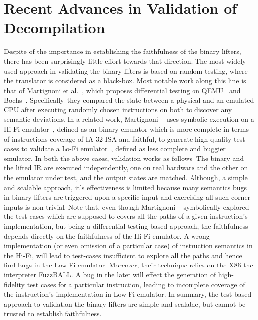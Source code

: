 \section{Recent Advances in Validation of Decompilation}\label{sec:recent-advances}

Despite of the importance in establishing the faithfulness of the binary
lifters, there has been surprisingly little effort towards that direction.
%
The most widely used approach in validating the binary lifters is based on
random testing, where the translator is considered as a black-box. Most notable
work along this line  is that of Martignoni et al.~\cite{Martignoni:ISSTA2009,
  Martignoni:ISSTA2010}, which proposes differential testing on
  QEMU~\cite{QEMU:USENIX05} and Bochs~\cite{Bochs1996}.  Specifically, they
  compared the state between a physical and an emulated CPU after executing
  randomly chosen instructions on both to discover any semantic deviations. In
  a related work, Martignoni \etal~\cite{Martignoni:ASPLOS2012} uses symbolic
  execution on a Hi-Fi emulator~\cite{Bochs1996}, defined as an binary emulator
  which is more complete in terms of instructions coverage of IA-32 ISA and
  faithful, to generate high-quality test cases to validate  a Lo-Fi
  emulator~\cite{QEMU:USENIX05}, defined as  less complete and buggier
  emulator. In both the above cases, validation works as follows: The binary
  and the lifted IR are executed independently, one on real hardware and the
  other on the emulator under test, and the output states are matched.
  Although, a simple and scalable approach, it's effectiveness is limited
  because many semantics bugs in binary lifters are triggered upon a specific
  input and exercising all such corner inputs is non-trivial. Note that, even
  though Martignoni \etal~\cite{Martignoni:ASPLOS2012} symbolically explored
  the test-cases which are supposed to covers all the paths of a given
  instruction's implementation, but being a differential testing-based
  approach, the faithfulness depends directly on  the faithfulness of the Hi-Fi
  emulator. A wrong implementation (or even omission of a particular case) of
  instruction semantics in the Hi-Fi, will lead to test-cases insufficient to
  explore all the paths and hence find bugs in the Low-Fi emulator. Moreover,
  their technique relies on the X86 the interpreter FuzzBALL. A bug in the
  later will effect the generation of high-fidelity test cases for a particular
  instruction, leading to incomplete coverage of the instruction's
  implementation in Low-Fi emulator. In summary, the test-based approach to
  validation the binary lifters are simple and scalable, but cannot be trusted
  to establish faithfulness.     

